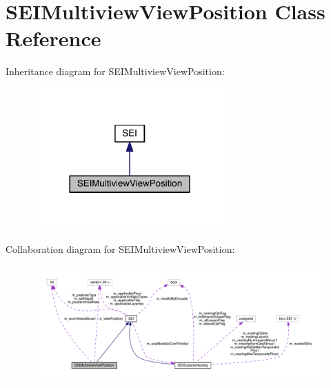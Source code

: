 \hypertarget{class_s_e_i_multiview_view_position}{}\section{S\+E\+I\+Multiview\+View\+Position Class Reference}
\label{class_s_e_i_multiview_view_position}


Inheritance diagram for S\+E\+I\+Multiview\+View\+Position\+:
\nopagebreak
\begin{figure}[H]
\begin{center}
\leavevmode
\includegraphics[width=210pt]{d4/d53/class_s_e_i_multiview_view_position__inherit__graph}
\end{center}
\end{figure}


Collaboration diagram for S\+E\+I\+Multiview\+View\+Position\+:
\nopagebreak
\begin{figure}[H]
\begin{center}
\leavevmode
\includegraphics[width=350pt]{d8/d19/class_s_e_i_multiview_view_position__coll__graph}
\end{center}
\end{figure}

